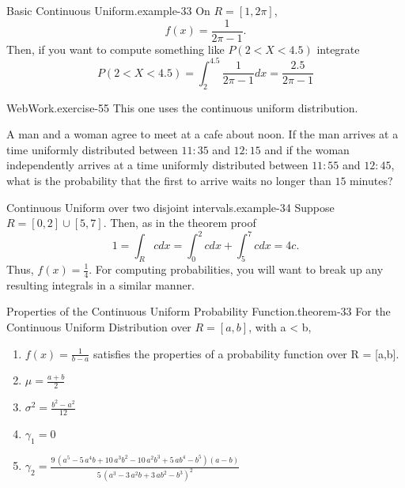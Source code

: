 \documentclass[10pt,]{book}
\numberwithin{equation}{section}
\begin{document}
%
\par
\hypertarget{p-809}{}%
\begin{example}{Basic Continuous Uniform.}{example-33}%
\hypertarget{p-810}{}%
On \(R = [1,2 \pi]\),%
\begin{equation*}
f(x) = \frac{1}{2 \pi - 1}.
\end{equation*}
Then, if you want to compute something like \(P(2 < X < 4.5)\) integrate%
\begin{equation*}
P(2 < X < 4.5) = \int_2^{4.5} \frac{1}{2 \pi -1} dx = \frac{2.5}{2 \pi - 1}
\end{equation*}
%
\end{example}
%
\par
\hypertarget{p-811}{}%
\begin{inlineexercise}{WebWork.}{exercise-55}%
\hypertarget{p-812}{}%
This one uses the continuous uniform distribution.%
\par\medskip
\hypertarget{p-813}{}%
A man and a woman agree to meet at a cafe about noon. If the man arrives at a time uniformly distributed between \(11:35\) and \(12:15\) and if the woman independently arrives at a time uniformly distributed between \(11:55\) and \(12:45\), what is the probability that the first to arrive waits no longer than \(15\) minutes?%
\end{inlineexercise}
%
\par
\hypertarget{p-815}{}%
\begin{example}{Continuous Uniform over two disjoint intervals.}{example-34}%
\hypertarget{p-816}{}%
Suppose \(R = [0,2] \cup [5,7]\).  Then, as in the theorem proof%
\begin{equation*}
1 = \int_R c dx = \int_0^2 c dx + \int_5^7 c dx = 4c.
\end{equation*}
Thus, \(f(x) = \frac{1}{4}\). For computing probabilities, you will want to break up any resulting integrals in a similar manner.%
\end{example}
%
\par
\hypertarget{p-817}{}%
\begin{theorem}{Properties of the Continuous Uniform Probability Function.}{}{theorem-33}%
\hypertarget{ContinuousUniformProperties}{}%
For the Continuous Uniform Distribution over \(R = [a,b]\), with a < b, \leavevmode%
\begin{enumerate}
\item\hypertarget{li-213}{}\(f(x) = \frac{1}{b-a}\) satisfies the properties of a probability function over R = [a,b].%
\item\hypertarget{li-214}{}\(\mu = \frac{a+b}{2}\)%
\item\hypertarget{li-215}{}\(\sigma^2 = \frac{b^2-a^2}{12}\)%
\item\hypertarget{li-216}{}\(\gamma_1 = 0\)%
\item\hypertarget{li-217}{}\(\gamma_2 = \frac{9 \, {\left(a^{5} - 5 \, a^{4} b + 10 \, a^{3} b^{2} - 10 \, a^{2} b^{3} + 5 \, a b^{4} - b^{5}\right)} {\left(a - b\right)}}{5 \, {\left(a^{3} - 3 \, a^{2} b + 3 \, a b^{2} - b^{3}\right)}^{2}}\)%
\end{enumerate}
%
\end{theorem}
\end{document}
